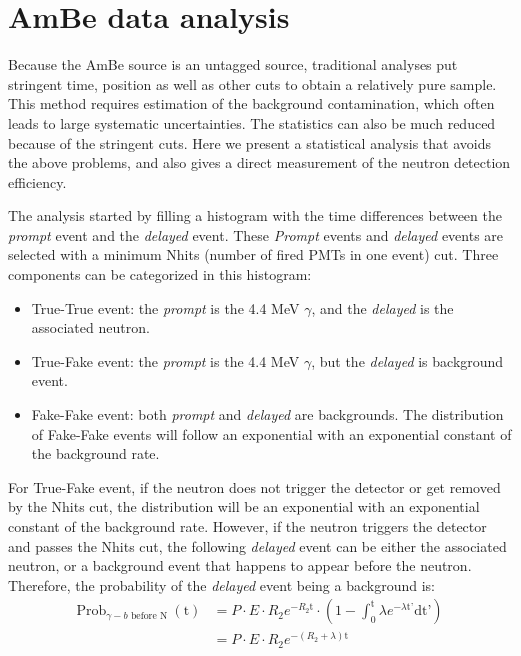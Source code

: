 \documentclass[a4paper]{jpconf}
\begin{document}
\section{AmBe data analysis}

Because the AmBe source is an untagged source, traditional analyses put stringent time, position as well as other cuts to obtain a relatively pure sample. This method requires estimation of the background contamination, which often leads to large systematic uncertainties. The statistics can also be much reduced because of the stringent cuts. Here we present a statistical analysis that avoids the above problems, and also gives a direct measurement of the neutron detection efficiency.

The analysis started by filling a histogram with the time differences between the \textit{prompt} event and the \textit{delayed} event. These \textit{Prompt} events and \textit{delayed} events are selected with a minimum Nhits (number of fired PMTs in one event) cut. Three components can be categorized in this histogram:

\begin{itemize}
\item True-True event: the \textit{prompt} is the 4.4 MeV $\gamma$, and the \textit{delayed} is the associated neutron. 
\item True-Fake event: the \textit{prompt} is the 4.4 MeV $\gamma$, but the \textit{delayed} is background event.
\item Fake-Fake event: both \textit{prompt} and \textit{delayed} are backgrounds. The distribution of Fake-Fake events will follow an exponential with an exponential constant of the background rate.
\end{itemize}

For True-Fake event, if the neutron does not trigger the detector or get removed by the Nhits cut, the distribution will be an exponential with an exponential constant of the background rate. However, if the neutron triggers the detector and passes the Nhits cut, the following \textit{delayed} event can be either the associated neutron, or a background event that happens to appear before the neutron. Therefore, the probability of the \textit{delayed} event being a background is:
\begin{equation}
\begin{aligned}
\textrm{Prob}_{\gamma - b\textrm{ before N }}(\textrm{t}) & = P \cdot E \cdot R_{2} e^{-R_{2}\textrm{t}} \cdot (1- \int_0^{\textrm{t}} \lambda e^{-\lambda \textrm{t'}}\textrm{dt'}) \\
& = P \cdot E \cdot R_{2} e^{-(R_{2}+\lambda)\textrm{t}}
\end{aligned}
\end{equation}
\end{document}
